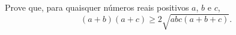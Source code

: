 Prove que, para quaisquer números reais positivos $a$, $b$ e $c$,
$$(a+b)(a+c) \ge 2 \sqrt{abc(a+b+c)}.$$